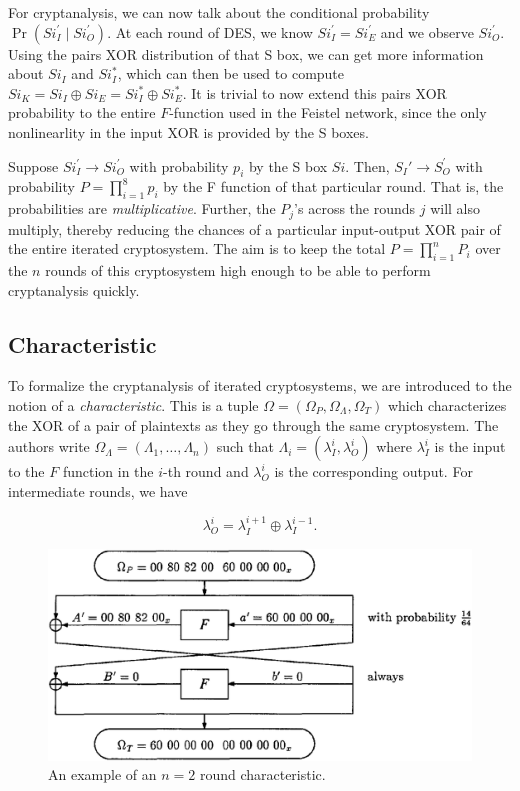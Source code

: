 \documentclass[twoside]{article}
\begin{document}
For cryptanalysis, we can now talk about the conditional probability \(\Pr(Si_I^\prime \mid Si_O^\prime)\). At each round of DES, we know \(Si_I^\prime = Si_E^\prime\) and we observe \(Si_O^\prime\). Using the pairs XOR distribution of that S box, we can get more information about \(Si_I\) and \(Si_I^*\), which can then be used to compute \(Si_K = Si_I \oplus Si_E = Si_I^* \oplus Si_E^*\). It is trivial to now extend this pairs XOR probability to the entire \(F\)-function used in the Feistel network, since the only nonlinearlity in the input XOR is provided by the S boxes.

Suppose \(Si_I^\prime \rightarrow Si_O^\prime\) with probability \(p_i\) by the S box \(Si\). Then, \(S_I\prime \rightarrow S_O^\prime\) with probability \(P = \prod_{i=1}^8p_i\) by the F function of that particular round. That is, the probabilities are \emph{multiplicative}. Further, the \(P_j\)'s across the rounds \(j\) will also multiply, thereby reducing the chances of a particular input-output XOR pair of the entire iterated cryptosystem. The aim is to keep the total \(P = \prod_{i=1}^nP_i\) over the \(n\) rounds of this cryptosystem high enough to be able to perform cryptanalysis quickly.

\subsection{Characteristic}

To formalize the cryptanalysis of iterated cryptosystems, we are introduced to the notion of a \emph{characteristic}. This is a tuple \(\Omega = (\Omega_P, \Omega_\Lambda, \Omega_T)\) which characterizes the XOR of a pair of plaintexts as they go through the same cryptosystem. The authors write \(\Omega_\Lambda = (\Lambda_1, \ldots, \Lambda_n)\) such that \(\Lambda_i = (\lambda_I^i, \lambda_O^i)\) where \(\lambda_I^i\) is the input to the \(F\) function in the \(i\)-th round and \(\lambda_O^i\) is the corresponding output. For intermediate rounds, we have

\begin{equation}
    \lambda_O^i = \lambda_I^{i+1} \oplus \lambda_I^{i-1}.
    \label{eq:lambda-io-rel}
\end{equation}

\begin{figure}[!ht]
    \centering
    \includegraphics[width=0.5\linewidth]{images/des_char.png}
    \caption{An example of an \(n=2\) round characteristic.}
    \label{fig:des-char}
\end{figure}
\end{document}

